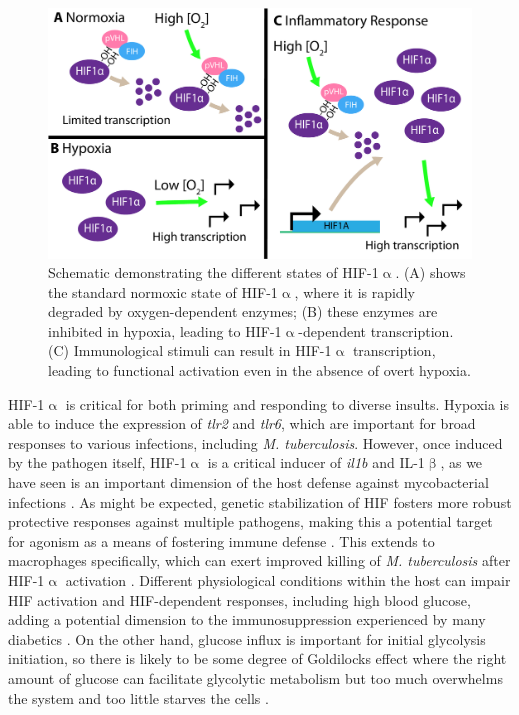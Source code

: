 \begin{figure}
\centering
\includegraphics[width=\textwidth]{images/hifreg.pdf}
\caption{Schematic demonstrating the different states of HIF-1$\upalpha$. (A) shows the standard normoxic state of HIF-1$\upalpha$, where it is rapidly degraded by oxygen-dependent enzymes; (B) these enzymes are inhibited in hypoxia, leading to HIF-1$\upalpha$-dependent transcription. (C) Immunological stimuli can result in HIF-1$\upalpha$ transcription, leading to functional activation even in the absence of overt hypoxia.}
\label{figure:hif}
\end{figure}

HIF-1$\upalpha$ is critical for both priming and responding to diverse insults. Hypoxia is able to induce the expression of \textit{tlr2} and \textit{tlr6}, which are important for broad responses to various infections, including \textit{M. tuberculosis}. However, once induced by the pathogen itself, HIF-1$\upalpha$ is a critical inducer of \textit{il1b} and IL-1$\upbeta$, as we have seen is an important dimension of the host defense against mycobacterial infections \citep{Ogryzko2019}. As might be expected, genetic stabilization of HIF fosters more robust protective responses against multiple pathogens, making this a potential target for agonism as a means of fostering immune defense \citep{Schild2020}. This extends to macrophages specifically, which can exert improved killing of \textit{M. tuberculosis} after HIF-1$\upalpha$ activation \citep{Li2021}. Different physiological conditions within the host can impair HIF activation and HIF-dependent responses, including high blood glucose, adding a potential dimension to the immunosuppression experienced by many diabetics \citep{Teran2022}. On the other hand, glucose influx is important for initial glycolysis initiation, so there is likely to be some degree of Goldilocks effect where the right amount of glucose can facilitate glycolytic metabolism but too much overwhelms the system and too little starves the cells \citep{Stunault2018}.

